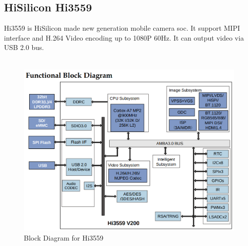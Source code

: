 \documentclass[12pt,article]{memoir}
\begin{document}
\subsection{HiSilicon Hi3559}
Hi3559 is HiSilicon made new generation mobile camera soc. It support MIPI interface and H.264 Video encoding up to 1080P 60Hz. It can output video via USB 2.0 bus.\\\\
\begin{figure}[htp]
\begin{center}
\includegraphics[width=\textwidth]{img/DR00002_Hi3559.png}
 \caption{Block Diagram for Hi3559}	
\end{center}
\end{figure}
\newpage
\end{document}
